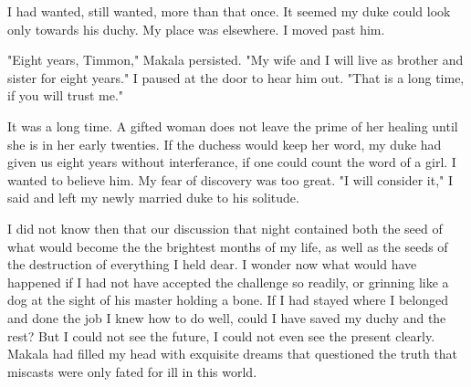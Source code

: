\documentclass{article}
\begin{document}
I had wanted, still wanted, more than that once. It seemed my duke could look only towards his duchy. My place was elsewhere. I moved past him.

"Eight years, Timmon," Makala persisted. "My wife and I will live as brother and sister for eight years." I paused at the door to hear him out. "That is a long time, if you will trust me."

It was a long time. A gifted woman does not leave the prime of her healing until she is in her early twenties. If the duchess would keep her word, my duke had given us eight years without interferance, if one could count the word of a girl. I wanted to believe him. My fear of discovery was too great. "I will consider it," I said and left my newly married duke to his solitude. 

I did not know then that our discussion that night contained both the seed of what would become the the brightest months of my life, as well as the seeds of the destruction of everything I held dear. I wonder now what would have happened if I had not have accepted the challenge so readily, or grinning like a dog at the sight of his master holding a bone. If I had stayed where I belonged and done the job I knew how to do well, could I have saved my duchy and the rest? But I could not see the future, I could not even see the present clearly. Makala had filled my head with exquisite dreams that questioned the truth that miscasts were only fated for ill in this world. 
\end{document}

